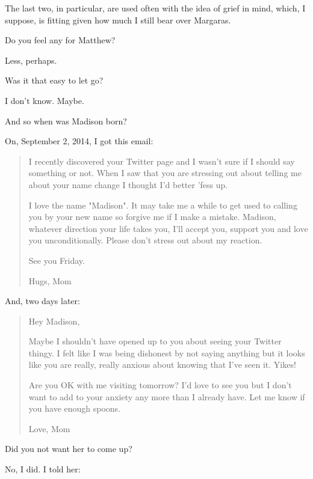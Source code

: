 \begin{paracol}{2}
\begin{leftcolumn}
The last two, in particular, are used often with the idea of grief in mind, which, I suppose, is fitting given how much I still bear over Margaras.

\begin{ally}
Do you feel any for Matthew?
\end{ally}
Less, perhaps.

\begin{ally}
Was it that easy to let go?
\end{ally}
I don't know. Maybe.
\newpage

\begin{ally}
And so when was Madison born?
\end{ally}
On, September 2, 2014, I got this email:

\begin{quotation}
I recently discovered your Twitter page and I wasn't sure if I should say something or not.  When I saw that you are stressing out about telling me about your name change I thought I'd better 'fess up.

I love the name "Madison".  It may take me a while to get used to calling you by your new name so forgive me if I make a mistake.  Madison, whatever direction your life takes you, I'll accept you, support you and love you unconditionally.  Please don't stress out about my reaction.

See you Friday.

Hugs,
Mom
\end{quotation}

And, two days later:

\begin{quotation}
Hey Madison,

Maybe I shouldn't have opened up to you about seeing your Twitter thingy.  I felt like I was being dishonest by not saying anything but it looks like you are really, really anxious about knowing that I've seen it.  Yikes!

Are you OK with me visiting tomorrow?  I'd love to see you but I don't want to add to your anxiety any more than I already have.  Let me know if you have enough spoons.

Love,
Mom
\end{quotation}

\begin{ally}
Did you not want her to come up?
\end{ally}
No, I did. I told her:


\end{leftcolumn}
\end{paracol}
